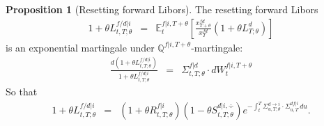 \documentclass[11pt,english]{amsart}
\newcommand{\EE}{\mathbb{E}}
\newcommand{\QQ}{\mathbb{Q}}
\theoremstyle{definition}
\newtheorem*{prop*}{Proposition}
\begin{document}
\begin{prop*}[Resetting forward Libors]
The resetting forward Libors 
\begin{eqnarray}
   1 + \theta L^{f/d|i}_{t,T;\theta} 
   &=& \EE^{f|i,T+\theta}_t\left[ \frac{x^{fd}_{T+\theta}}{x^{fd}_{T}} (1+\theta L^{d}_{T;\theta}) \right] 
\end{eqnarray} 
is an exponential martingale under $\QQ^{f|i,T+\theta}$-martingale:
\begin{eqnarray}
   \frac{d(1 + \theta L^{f/d|i}_{t,T;\theta})}{1 + \theta L^{f/d|i}_{t,T;\theta}}
   &=& \Sigma^{f|d}_{t,T;\theta} \cdot dW^{f|i,T+\theta}_t 
\end{eqnarray} 
So that
\begin{eqnarray}
  1 + \theta L^{f/d|i}_{t,T;\theta} 
   &=& (1+\theta R^{f|i}_{t,T;\theta}) (1-\theta S^{d|i,\div}_{t,T;\theta}) e^{ - \int_t^T \Sigma^{d\to i}_{u,T;\theta} \cdot \Sigma^{df|i}_{u,T} \,du }.
\end{eqnarray} 
\end{prop*}
\end{document}
